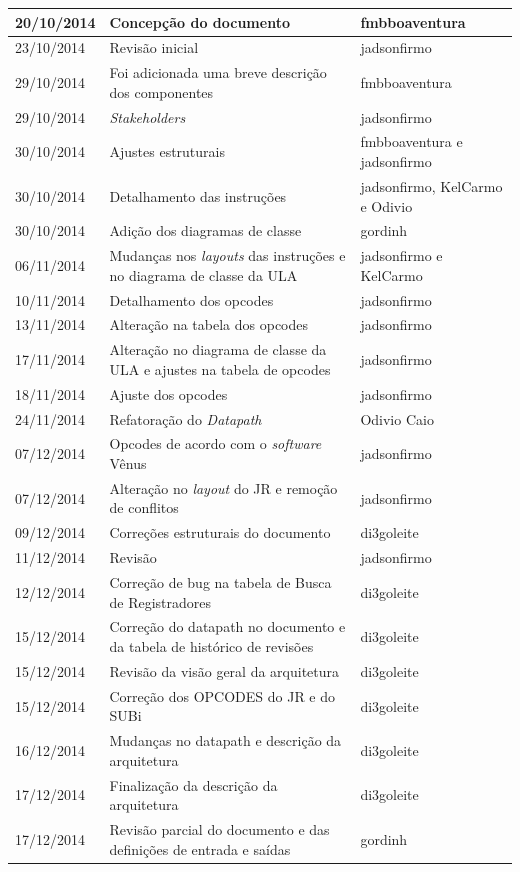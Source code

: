 \documentclass{report}
\begin{document}
\begin{center}
\begin{longtable}[pos]{|m{2cm} | m{8cm} | m{4cm}|}
		20/10/2014 & Concepção do documento & fmbboaventura \\ \hline
		23/10/2014 & Revisão inicial & jadsonfirmo \\ \hline
		29/10/2014 & Foi adicionada uma breve descrição dos componentes & fmbboaventura \\ \hline       
		29/10/2014 & \textit{Stakeholders} & jadsonfirmo \\ \hline
		30/10/2014 & Ajustes estruturais & fmbboaventura e jadsonfirmo \\ \hline
		30/10/2014 & Detalhamento das instruções & jadsonfirmo, KelCarmo e Odivio \\ \hline
		30/10/2014 & Adição dos diagramas de classe & gordinh \\ \hline
		06/11/2014 & Mudanças nos \textit{layouts} das instruções e no diagrama de classe da ULA & jadsonfirmo e KelCarmo \\ \hline
		10/11/2014 & Detalhamento dos opcodes & jadsonfirmo \\ \hline
		13/11/2014 & Alteração na tabela dos opcodes & jadsonfirmo \\ \hline
		17/11/2014 & Alteração no diagrama de classe da ULA e ajustes na tabela de opcodes & jadsonfirmo \\ \hline
		18/11/2014 & Ajuste dos opcodes & jadsonfirmo \\ \hline
		24/11/2014 & Refatoração do \textit{Datapath} & Odivio Caio \\ \hline
		07/12/2014 & Opcodes de acordo com o \textit{software} Vênus & jadsonfirmo \\ \hline
		07/12/2014 & Alteração no \textit{layout} do JR e remoção de conflitos & jadsonfirmo \\ \hline
		09/12/2014 & Correções estruturais do documento & di3goleite \\ \hline
		11/12/2014 & Revisão & jadsonfirmo \\ \hline
		12/12/2014 & Correção de bug na tabela de Busca de Registradores & di3goleite \\ \hline
		15/12/2014 & Correção do datapath no documento e da tabela de histórico de revisões & di3goleite \\ \hline
		15/12/2014 & Revisão da visão geral da arquitetura & di3goleite \\ \hline
		15/12/2014 & Correção dos OPCODES do JR e do SUBi & di3goleite \\ \hline
		16/12/2014 & Mudanças no datapath e descrição da arquitetura & di3goleite \\ \hline
		17/12/2014 & Finalização da descrição da arquitetura & di3goleite \\ \hline
		17/12/2014 & Revisão parcial do documento e das definições de entrada e saídas &gordinh \\ \hline
	\end{longtable}
\end{center}
\end{document}
